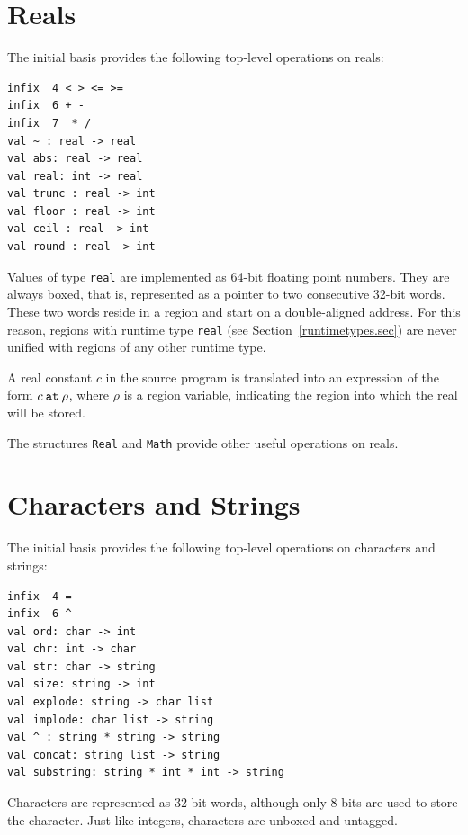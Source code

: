 \documentclass[12pt]{book}
\begin{document}
\section{Reals}
The 
%
initial basis provides the following top-level operations on reals:
%
%
%
%
%
%
%
%
%
%
%
%
%
%
%
%
%
\begin{verbatim}
infix  4 < > <= >= 
infix  6 + - 
infix  7  * /
val ~ : real -> real
val abs: real -> real
val real: int -> real
val trunc : real -> int
val floor : real -> int
val ceil : real -> int
val round : real -> int
\end{verbatim}
Values of type {\tt real} are implemented as 64-bit floating point
numbers.  They are always boxed, that is, represented as a pointer to
two consecutive 32-bit words.  These two words reside
in a region and start on a double-aligned address. For this reason,
regions with 
%
runtime type {\tt real} (see
Section~\ref{runtimetypes.sec}) are never unified with regions of any
other runtime type.

A real constant $c$ in the source program is translated into an
expression of the form $c\mathbin{\hbox{\tt at}}\rho$, where $\rho$ is
a region variable, indicating the region into which the real will be
stored.

The structures {\tt Real} and {\tt Math} provide other useful
operations on reals.

\section{Characters and Strings}
The 
%
initial basis provides the following top-level operations on characters and strings:
%
%
%
%
%
%
%
%
%
%
\begin{verbatim}
infix  4 = 
infix  6 ^
val ord: char -> int
val chr: int -> char
val str: char -> string
val size: string -> int
val explode: string -> char list
val implode: char list -> string
val ^ : string * string -> string
val concat: string list -> string
val substring: string * int * int -> string
\end{verbatim}
Characters are represented as 32-bit words, although only 8 bits are
used to store the character. Just like integers, characters are
unboxed and untagged.
\end{document}
